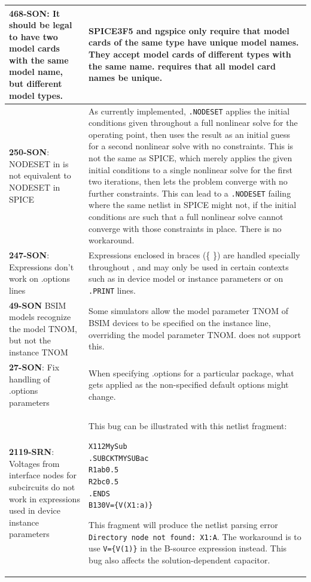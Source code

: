 {\begin{longtable}[h] {>{\raggedright\small}m{2in}|>{\raggedright\let\\\tabularnewline\small}m{3.5in}}
\textbf{468-SON}: It should be legal to have two model cards with the same model
name, but different model types. & SPICE3F5 and ngspice only require
that model cards of the same type have unique model names. They accept
model cards of different types with the same name.  \Xyce{} requires
that all model card names be unique.
\\ \hline


\textbf{250-SON}: NODESET in \Xyce{} is not equivalent to NODESET in SPICE & As
currently implemented, \texttt{.NODESET} applies the initial
conditions given throughout a full nonlinear solve for the operating
point, then uses the result as an initial guess for a second nonlinear
solve with no constraints.  This is not the same as SPICE, which
merely applies the given initial conditions to a single nonlinear
solve for the first two iterations, then lets the problem converge
with no further constraints.  This can lead to
a \Xyce{} \texttt{.NODESET} failing where the same netlist in SPICE
might not, if the initial conditions are such that a full nonlinear
solve cannot converge with those constraints in place.  There is no
workaround.
\\ \hline

\textbf{247-SON}: Expressions don't work on .options lines & Expressions
enclosed in braces (\{ \}) are handled specially throughout \Xyce{},
and may only be used in certain contexts such as in device model or
instance parameters or on \texttt{.PRINT} lines.
\\ \hline


\textbf{49-SON} \Xyce{} BSIM models recognize the model TNOM, but not the
instance TNOM & Some simulators allow the model parameter TNOM of BSIM
devices to be specified on the instance line, overriding the model
parameter TNOM.  \Xyce{} does not support this.
\\ \hline


\textbf{27-SON}: Fix handling of .options parameters & When specifying .options
for a particular package, what gets applied as the non-specified
default options might change.  \\ \hline

\textbf{2119-SRN}: Voltages from interface nodes for subcircuits do not 
work in expressions used in device instance parameters & This bug can be
illustrated with this netlist fragment:
\begin{alltt}
X1 1 2 MySub
.SUBCKT MYSUB a c
R1   a b 0.5
R2   b c 0.5
.ENDS
B1 3 0 V=\{V(X1:a)\}
\end{alltt}
This fragment will produce the netlist parsing error \texttt{Directory 
node not found: X1:A}.  The workaround is to use \texttt{V=\{V(1)\}} 
in the B-source expression instead.  This bug also affects the 
solution-dependent capacitor.
\\ \hline


\end{longtable}}
